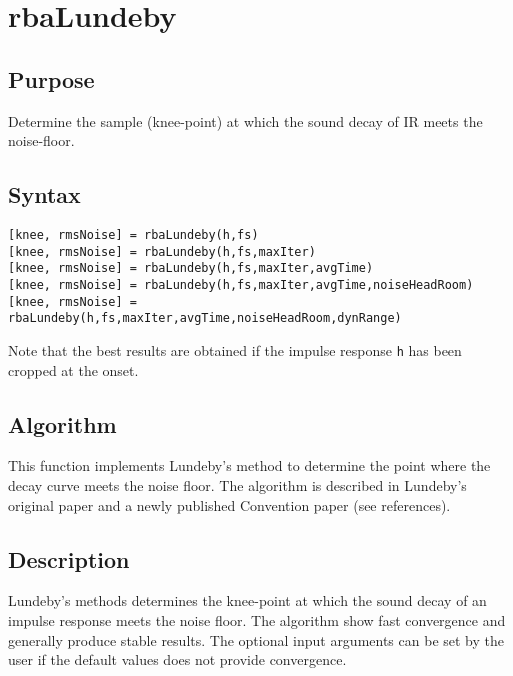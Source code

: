 
\chapter{rbaLundeby} %
\label{cha:rbaLundeby} %

\section{Purpose} %
\label{sec:rbaLundeby_purpose}
Determine the sample (knee-point) at which the sound decay of IR meets the noise-floor.


\section{Syntax} %
\label{sec:rbaLundeby_syntax}

\texttt{[knee, rmsNoise] = rbaLundeby(h,fs)}\\
\texttt{[knee, rmsNoise] = rbaLundeby(h,fs,maxIter)}\\
\texttt{[knee, rmsNoise] = rbaLundeby(h,fs,maxIter,avgTime)}\\
\texttt{[knee, rmsNoise] = rbaLundeby(h,fs,maxIter,avgTime,noiseHeadRoom)}\\
\texttt{[knee, rmsNoise] = rbaLundeby(h,fs,maxIter,avgTime,noiseHeadRoom,dynRange)}

Note that the best results are obtained if the impulse response \texttt{h} has been cropped at the onset.

\section{Algorithm} %
\label{sec:rbaLundeby_algorithm}
This function implements Lundeby's method to determine the point where the decay curve meets the noise floor. The algorithm is described in Lundeby's original paper and a newly published Convention paper (see references).


\section{Description} %
\label{sec:rbaLundeby_description}
Lundeby's methods determines the knee-point at which the sound decay of an impulse response meets the noise floor. The algorithm show fast convergence and generally produce stable results. The optional input arguments can be set by the user if the default values does not provide convergence.

